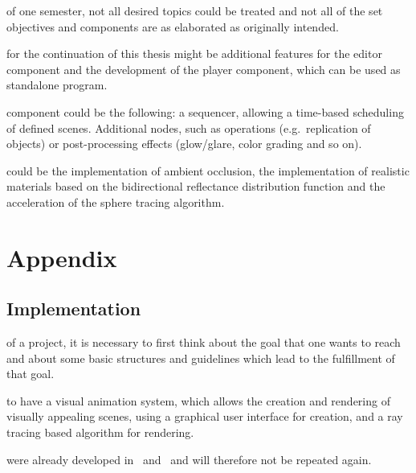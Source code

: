 \documentclass[%
    a4paper,    %
    justified,  %
    nobib,      %
    openany     %
]{tufte-book}
\makeatletter
\renewcommand{\label}[1]{\@tufte@label{##1}}%
\makeatother
\begin{document}
 of one semester, not all
desired topics could be treated and not all of the set objectives and
components are as elaborated as originally intended.

 for the continuation of this thesis might be
additional features for the editor component and the development of the player
component, which can be used as standalone program.

 component could be the
following: a sequencer, allowing a time-based scheduling of defined scenes.
Additional nodes, such as operations (e.g.\ replication of objects) or
post-processing effects (glow/glare, color grading and so on).

 could be the implementation of
ambient occlusion, the implementation of realistic materials based on the
bidirectional reflectance distribution function and the acceleration of the
sphere tracing algorithm.
\backmatter{}


\appendix
\part*{Appendix}
\label{part:appendix}


\chapter{Implementation}
\label{appendix:chap:implementation}

 of a project, it is necessary to
first think about the goal that one wants to reach and about some basic
structures and guidelines which lead to the fulfillment of that goal.

 to have a visual animation system, which allows
the creation and rendering of visually appealing scenes, using a graphical user
interface for creation, and a ray tracing based algorithm for
rendering.

 were already developed
in~ and~ and will
therefore not be repeated again.
\end{document}
